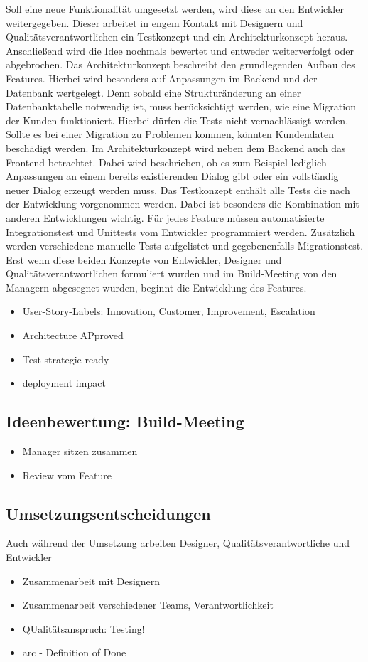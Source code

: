 Soll eine neue Funktionalität umgesetzt werden, wird diese an den Entwickler weitergegeben. Dieser 
arbeitet in engem Kontakt mit Designern und Qualitätsverantwortlichen ein Testkonzept und ein Architekturkonzept heraus. 
Anschließend wird die Idee nochmals bewertet und entweder weiterverfolgt oder abgebrochen. Das Architekturkonzept beschreibt den 
grundlegenden Aufbau des Features. Hierbei wird besonders auf Anpassungen im Backend und der Datenbank wertgelegt. Denn sobald eine Strukturänderung 
an einer Datenbanktabelle notwendig ist, muss berücksichtigt werden, wie eine Migration der Kunden funktioniert. Hierbei dürfen die Tests nicht 
vernachlässigt werden. Sollte es bei einer Migration zu Problemen kommen, könnten Kundendaten beschädigt werden. Im Architekturkonzept wird 
neben dem Backend auch das Frontend betrachtet. Dabei wird beschrieben, ob es zum Beispiel lediglich Anpassungen an einem bereits existierenden
Dialog gibt oder ein vollständig neuer Dialog erzeugt werden muss. 
Das Testkonzept enthält alle Tests die nach der Entwicklung vorgenommen werden. Dabei ist besonders die Kombination mit anderen Entwicklungen 
wichtig. Für jedes Feature müssen automatisierte Integrationstest und Unittests vom Entwickler programmiert werden. Zusätzlich werden verschiedene
manuelle Tests aufgelistet und gegebenenfalls Migrationstest.\\
Erst wenn diese beiden Konzepte von Entwickler, Designer und Qualitätsverantwortlichen formuliert wurden und im Build-Meeting von den Managern abgesegnet 
wurden, beginnt die Entwicklung des Features. 
\begin{itemize}
    \item User-Story-Labels: Innovation, Customer, Improvement, Escalation
    \item Architecture APproved
    \item Test strategie ready 
    \item deployment impact 
\end{itemize}
\subsection{Ideenbewertung: Build-Meeting}
\begin{itemize}
    \item Manager sitzen zusammen 
    \item Review vom Feature
\end{itemize}
\subsection{Umsetzungsentscheidungen}
Auch während der Umsetzung arbeiten Designer, Qualitätsverantwortliche und Entwickler 
\begin{itemize}
    \item Zusammenarbeit mit Designern
    \item Zusammenarbeit verschiedener Teams, Verantwortlichkeit
    \item QUalitätsanspruch: Testing! 
    \item \ac{arc} - Definition of Done
\end{itemize}